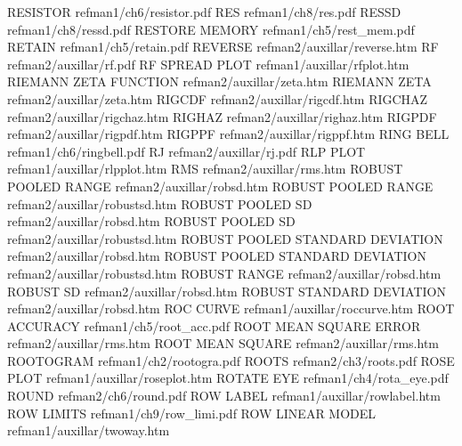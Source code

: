 RESISTOR                                refman1/ch6/resistor.pdf
RES                                     refman1/ch8/res.pdf
RESSD                                   refman1/ch8/ressd.pdf
RESTORE MEMORY                          refman1/ch5/rest_mem.pdf
RETAIN                                  refman1/ch5/retain.pdf
REVERSE                                 refman2/auxillar/reverse.htm
RF                                      refman2/auxillar/rf.pdf
RF SPREAD PLOT                          refman1/auxillar/rfplot.htm
RIEMANN ZETA FUNCTION                   refman2/auxillar/zeta.htm
RIEMANN ZETA                            refman2/auxillar/zeta.htm
RIGCDF                                  refman2/auxillar/rigcdf.htm
RIGCHAZ                                 refman2/auxillar/rigchaz.htm
RIGHAZ                                  refman2/auxillar/righaz.htm
RIGPDF                                  refman2/auxillar/rigpdf.htm
RIGPPF                                  refman2/auxillar/rigppf.htm
RING BELL                               refman1/ch6/ringbell.pdf
RJ                                      refman2/auxillar/rj.pdf
RLP PLOT                                refman1/auxillar/rlpplot.htm
RMS                                     refman2/auxillar/rms.htm
ROBUST POOLED RANGE                     refman2/auxillar/robsd.htm
ROBUST POOLED RANGE                     refman2/auxillar/robustsd.htm
ROBUST POOLED SD                        refman2/auxillar/robsd.htm
ROBUST POOLED SD                        refman2/auxillar/robustsd.htm
ROBUST POOLED STANDARD DEVIATION        refman2/auxillar/robsd.htm
ROBUST POOLED STANDARD DEVIATION        refman2/auxillar/robustsd.htm
ROBUST RANGE                            refman2/auxillar/robsd.htm
ROBUST SD                               refman2/auxillar/robsd.htm
ROBUST STANDARD DEVIATION               refman2/auxillar/robsd.htm
ROC CURVE                               refman1/auxillar/roccurve.htm
ROOT ACCURACY                           refman1/ch5/root_acc.pdf
ROOT MEAN SQUARE ERROR                  refman2/auxillar/rms.htm
ROOT MEAN SQUARE                        refman2/auxillar/rms.htm
ROOTOGRAM                               refman1/ch2/rootogra.pdf
ROOTS                                   refman2/ch3/roots.pdf
ROSE PLOT                               refman1/auxillar/roseplot.htm
ROTATE EYE                              refman1/ch4/rota_eye.pdf
ROUND                                   refman2/ch6/round.pdf
ROW LABEL                               refman1/auxillar/rowlabel.htm
ROW LIMITS                              refman1/ch9/row_limi.pdf
ROW LINEAR MODEL                        refman1/auxillar/twoway.htm
